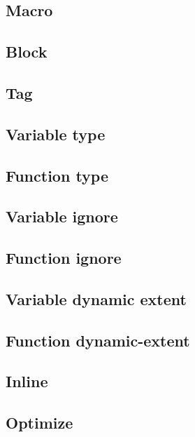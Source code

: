 \subsection {Macro}


\subsection {Block}


\subsection {Tag}


\subsection {Variable type}


\subsection {Function type}


\subsection {Variable ignore}


\subsection {Function ignore}


\subsection {Variable dynamic extent}


\subsection {Function dynamic-extent}


\subsection {Inline}


\subsection {Optimize}


